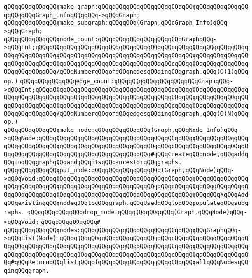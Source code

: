 \newline
\verb|qQQqqQQqqQQqqQQqmake_graph:qQQqqQQqqQQqqQQqqQQqqQQqqQQqqQQqqQQqqQQqqQQqqQQqqQQqGraph_InfoqQQqqQQq->qQQqGraph;|\newline
\verb|qQQqqQQqqQQqqQQqmake_subgraph:qQQqqQQq(Graph,qQQqGraph_Info)qQQq->qQQqGraph;|\newline
\newline
\verb|qQQqqQQqqQQqqQQqnode_count:qQQqqQQqqQQqqQQqqQQqqQQqGraphqQQq->qQQqInt;qQQqqQQqqQQqqQQqqQQqqQQqqQQqqQQqqQQqqQQqqQQqqQQqqQQqqQQqqQQqqQQqqQQqqQQqqQQqqQQqqQQqqQQqqQQqqQQqqQQqqQQqqQQqqQQqqQQqqQQqqQQqqQQqqQQqqQQqqQQqqQQqqQQqqQQqqQQqqQQqqQQqqQQqqQQqqQQqqQQqqQQqqQQqqQQqqQQqqQQqqQQqqQQqqQQqqQQq#qQQqNumberqQQqofqQQqnodesqQQqinqQQqgraph.qQQq(O(1)qQQqop.)|\newline
\verb|qQQqqQQqqQQqqQQqedge_count:qQQqqQQqqQQqqQQqqQQqqQQqGraphqQQq->qQQqInt;qQQqqQQqqQQqqQQqqQQqqQQqqQQqqQQqqQQqqQQqqQQqqQQqqQQqqQQqqQQqqQQqqQQqqQQqqQQqqQQqqQQqqQQqqQQqqQQqqQQqqQQqqQQqqQQqqQQqqQQqqQQqqQQqqQQqqQQqqQQqqQQqqQQqqQQqqQQqqQQqqQQqqQQqqQQqqQQqqQQqqQQqqQQqqQQqqQQqqQQqqQQqqQQqqQQqqQQq#qQQqNumberqQQqofqQQqedgesqQQqinqQQqgraph.qQQq(O(N)qQQqop.)|\newline
\newline
\verb|qQQqqQQqqQQqqQQqmake_node:qQQqqQQqqQQqqQQq(Graph,qQQqNode_Info)qQQq->qQQqNode;qQQqqQQqqQQqqQQqqQQqqQQqqQQqqQQqqQQqqQQqqQQqqQQqqQQqqQQqqQQqqQQqqQQqqQQqqQQqqQQqqQQqqQQqqQQqqQQqqQQqqQQqqQQqqQQqqQQqqQQqqQQqqQQqqQQqqQQqqQQqqQQqqQQqqQQqqQQqqQQqqQQqqQQqqQQq#qQQqCreateqQQqnode,qQQqaddqQQqtoqQQqgraphqQQqandqQQqitsqQQqancestorqQQqgraphs.|\newline
\verb|qQQqqQQqqQQqqQQqput_node:qQQqqQQqqQQqqQQqqQQq(Graph,qQQqNode)qQQq->qQQqVoid;qQQqqQQqqQQqqQQqqQQqqQQqqQQqqQQqqQQqqQQqqQQqqQQqqQQqqQQqqQQqqQQqqQQqqQQqqQQqqQQqqQQqqQQqqQQqqQQqqQQqqQQqqQQqqQQqqQQqqQQqqQQqqQQqqQQqqQQqqQQqqQQqqQQqqQQqqQQqqQQqqQQqqQQqqQQqqQQqqQQqqQQqqQQqqQQq#qQQqAddqQQqexistingqQQqnodeqQQqtoqQQqgraph.qQQqUsedqQQqtoqQQqpopulateqQQqsubgraphs.|\newline
\verb|qQQqqQQqqQQqqQQqdrop_node:qQQqqQQqqQQqqQQq(Graph,qQQqNode)qQQq->qQQqVoid;|\newline
\verb|qQQqqQQqqQQqqQQq#|\newline
\verb|qQQqqQQqqQQqqQQqnodes:qQQqqQQqqQQqqQQqqQQqqQQqqQQqqQQqqQQqGraphqQQq->qQQqList(Node);qQQqqQQqqQQqqQQqqQQqqQQqqQQqqQQqqQQqqQQqqQQqqQQqqQQqqQQqqQQqqQQqqQQqqQQqqQQqqQQqqQQqqQQqqQQqqQQqqQQqqQQqqQQqqQQqqQQqqQQqqQQqqQQqqQQqqQQqqQQqqQQqqQQqqQQqqQQqqQQqqQQqqQQqqQQqqQQqqQQqqQQqqQQqqQQqqQQq#qQQqReturnqQQqlistqQQqofqQQqqQQqqQQqqQQqqQQqqQQqqQQqallqQQqNodesqQQqinqQQqgraph.|\newline
